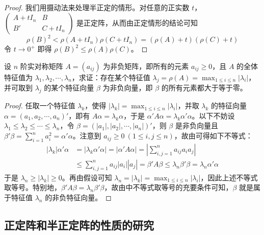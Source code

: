 \documentclass[../../main.tex]{subfiles}
\begin{document}
\begin{proof}
我们用摄动法来处理半正定的情形。对任意的正实数 \(t\)，\(\begin{pmatrix}
A + tI_n & B \\
B' & C + tI_n
\end{pmatrix}\) 是正定阵，从而由正定情形的结论可知
\[
\rho(B)^2 < \rho(A + tI_n)\rho(C + tI_n) = (\rho(A) + t)(\rho(C) + t)
\]
令 \(t \to 0^{+}\) 即得 \(\rho(B)^2 \leqslant  \rho(A)\rho(C)\)。 

\end{proof}

\begin{proposition}\label{proposition:例9.58}
设 \(n\) 阶实对称矩阵 \(A = (a_{ij})\) 为非负矩阵，即所有的元素 \(a_{ij} \geqslant  0\)，且 \(A\) 的全体特征值为 \(\lambda_1,\lambda_2,\cdots,\lambda_n\)，求证：存在某个特征值 \(\lambda_j = \rho(A) = \max_{1\leqslant  i \leqslant  n}|\lambda_i|\)，并可取到 \(\lambda_j\) 的某个特征向量 \(\beta\) 为非负向量，即 \(\beta\) 的所有元素都大于等于零。
\end{proposition}
\begin{proof}
任取一个特征值 \(\lambda_k\)，使得 \(|\lambda_k| = \max_{1\leqslant  i \leqslant  n}|\lambda_i|\)，并取 \(\lambda_k\) 的特征向量 \(\alpha = (a_1,a_2,\cdots,a_n)'\)，即有 \(A\alpha = \lambda_k\alpha\)，于是 \(\alpha'A\alpha = \lambda_k\alpha'\alpha\)。以下不妨设 \(\lambda_1 \leqslant  \lambda_2 \leqslant  \cdots \leqslant  \lambda_n\)，令 \(\beta = (|a_1|,|a_2|,\cdots,|a_n|)'\)，则 \(\beta\) 是非负向量且 \(\beta'\beta = \sum_{i = 1}^{n}a_i^2 = \alpha'\alpha\)。注意到 \(a_{ij} \geqslant  0\ (1\leqslant  i,j \leqslant  n)\)，故由可得如下不等式：
\begin{align*}
|\lambda_k|\alpha'\alpha &= |\lambda_k\alpha'\alpha| = |\alpha'A\alpha| = \left|\sum_{i,j = 1}^{n}a_{ij}a_ia_j\right|\\
&\leqslant  \sum_{i,j = 1}^{n}a_{ij}|a_i||a_j| = \beta'A\beta \leqslant  \lambda_n\beta'\beta = \lambda_n\alpha'\alpha
\end{align*}
于是 \(\lambda_n \geqslant  |\lambda_k| \geqslant  0\)。再由假设可知 \(\lambda_n = |\lambda_k| = \max_{1\leqslant  i \leqslant  n}|\lambda_i|\)，因此上述不等式取等号。特别地，\(\beta'A\beta = \lambda_n\beta'\beta\)，故由中不等式取等号的充要条件可知，\(\beta\) 就是属于特征值 \(\lambda_n\) 的非负特征向量。 

\end{proof}


\subsection{正定阵和半正定阵的性质的研究}
\end{document}
